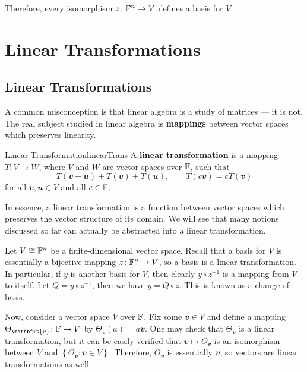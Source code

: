 \documentclass[math, code]{amznotes}
\theoremstyle{remark}
\begin{document}
Therefore, every isomorphism $z \colon \mathbb{F}^n \to V$ defines a basis for $V$.
\chapter{Linear Transformations}
\section{Linear Transformations}
A common misconception is that linear algebra is a study of matrices --- it is not. The real subject studied in linear algebra is \textbf{mappings} between vector spaces which preserves linearity.
\begin{dfnbox}{Linear Transformation}{linearTrans}
    A {\color{red} \textbf{linear transformation}} is a mapping $T \colon V \to W$, where $V$ and $W$ are vector spaces over $\mathbb{F}$, such that
    \begin{equation*}
        T(\mathbfit{v + u}) + T(\mathbfit{v}) + T(\mathbfit{u}), \qquad T(c\mathbfit{v}) = cT(\mathbfit{v})
    \end{equation*}
    for all $\mathbfit{v}, \mathbfit{u} \in V$ and all $c \in \mathbb{F}$.
\end{dfnbox}
In essence, a linear transformation is a function between vector spaces which preserves the vector structure of its domain. We will see that many notions discussed so far can actually be abstracted into a linear transformation.

Let $V \cong \mathbb{F}^n$ be a finite-dimensional vector space. Recall that a basis for $V$ is essentially a bijective mapping $z \colon \mathbb{F}^n \to V$, so a basis is a linear transformation. In particular, if $y$ is another basis for $V$, then clearly $y \circ z^{-1}$ is a mapping from $V$ to itself. Let $Q = y \circ z^{-1}$, then we have $y = Q \circ z$. This is known as a change of basis.

Now, consider a vector space $V$ over $\mathbb{F}$. Fix some $\mathbfit{v} \in V$ and define a mapping $\Theta_{\mathbfit{v}} \colon \F \to V$ by $\Theta_{\mathbfit{v}}(a) = a\mathbfit{v}$. One may check that $\Theta_{\mathbfit{v}}$ is a linear transformation, but it can be easily verified that $\mathbfit{v} \mapsto \Theta_{\mathbfit{v}}$ is an isomorphism between $V$ and $\left\{\Theta_{\mathbfit{v}} \colon \mathbfit{v} \in V\right\}$. Therefore, $\Theta_{\mathbfit{v}}$ is essentially $\mathbfit{v}$, so vectors are linear transformations as well.
\end{document}
